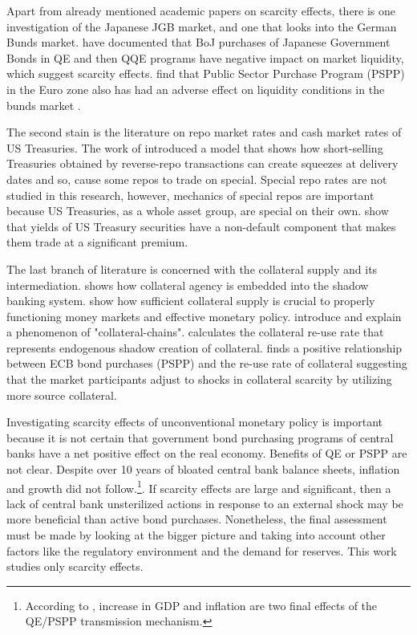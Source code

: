 \documentclass[11pt,a4paper,english,oneside]{article}
\begin{document}
Apart from already mentioned academic papers on scarcity effects, there is one investigation of the Japanese JGB market, and one that looks into the German Bunds market. \citet{han2018} have documented that BoJ purchases of Japanese Government Bonds in QE and then QQE programs have negative impact on market liquidity, which suggest scarcity effects. \citet{schlepper2017} find that Public Sector Purchase Program (PSPP) in the Euro zone also has had an adverse effect on liquidity conditions in the bunds market .

The second stain is the literature on repo market rates and cash market rates of US Treasuries. The work of \citet{duffie1996} introduced a model that shows how short-selling Treasuries obtained by reverse-repo transactions can create squeezes at delivery dates and so, cause some repos to trade on special. Special repo rates are not studied in this research, however, mechanics of special repos are important because US Treasuries, as a whole asset group, are special on their own. \citet{krishnamurthy2012} show that yields of US Treasury securities have a non-default component that makes them trade at a significant premium. 

The last branch of literature is concerned with the collateral supply and its intermediation. \citet{singh2011} shows how collateral agency is embedded into the shadow banking system. \citet{sissoko2020} show how sufficient collateral supply is crucial to properly functioning money markets and effective monetary policy. \citet{singh2012} introduce and explain a phenomenon of "collateral-chains". \citet{singh2017} calculates the collateral re-use rate that represents endogenous shadow creation of collateral. \citet{jank2021} finds a positive relationship between ECB bond purchases (PSPP) and the re-use rate of collateral suggesting that the market participants adjust to shocks in collateral scarcity by utilizing more source collateral.

Investigating scarcity effects of unconventional monetary policy is important because it is not certain that government bond purchasing programs of central banks have a net positive effect on the real economy. Benefits of QE or PSPP are not clear. Despite over 10 years of bloated central bank balance sheets, inflation and growth did not follow.\footnote{According to \citet{gern2015}, increase in GDP and inflation are two final effects of the QE/PSPP transmission mechanism.}. If scarcity effects are large and significant, then a lack of central bank unsterilized actions in response to an external shock may be more beneficial than active bond purchases. Nonetheless, the final assessment must be made by looking at the bigger picture and taking into account other factors like the regulatory environment and the demand for reserves. This work studies only scarcity effects.
\end{document}
